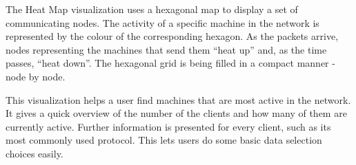 The Heat Map visualization uses a hexagonal map to display a set of communicating nodes.
The activity of a specific machine in the network is represented by the colour of the 
corresponding hexagon. As the packets arrive, nodes representing the machines that send them
``heat up'' and, as the time passes, ``heat down''. The hexagonal grid is being filled in a 
compact manner - node by node.

This visualization helps a user find machines that are most active in the network.
It gives a quick overview of the number of the clients and how many of them are currently active.
Further information is presented for every client, such as its most commonly used protocol. This lets users do some basic data selection choices easily.
